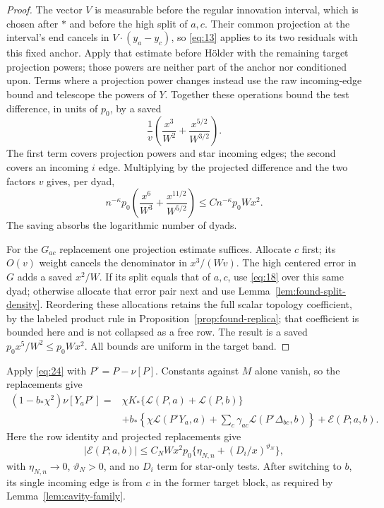 \begin{proof}
The vector \(V\) is measurable before the regular
innovation interval, which is chosen after \(*\)
and before the high split of \(a,c\).
Their common projection at the interval's end
cancels in \(V\cdot(y_a-y_c)\), so \eqref{eq:13}
applies to its two residuals with this fixed anchor.
Apply that estimate before H\"older with the remaining
target projection powers; those powers are neither
part of the anchor nor conditioned upon.
Terms where a projection power changes instead
use the raw incoming-edge bound and telescope
the powers of \(Y\). Together these operations
bound the test difference, in units of \(p_0\),
by a saved
\[
 \frac1v\left(\frac{x^3}{W^2}
                          +\frac{x^{5/2}}{W^{3/2}}\right).
\]
The first term covers projection powers and star incoming
edges; the second covers an incoming \(i\) edge.
Multiplying by the projected difference and the two
factors \(v\) gives, per dyad,
\[
 n^{-\kappa}p_0
  \left(\frac{x^6}{W^3}+\frac{x^{11/2}}{W^{5/2}}\right)
                           \le Cn^{-\kappa}p_0Wx^2.
\]
The saving absorbs the logarithmic number of dyads.

For the \(G_{ac}\) replacement one projection estimate
suffices. Allocate \(c\) first; its \(O(v)\) weight
cancels the denominator in \(x^3/(Wv)\).
The high centered error in \(G\) adds a saved \(x^2/W\).
If its split equals that of \(a,c\), use \eqref{eq:18}
over this same dyad; otherwise allocate that error pair
next and use Lemma~\ref{lem:found-split-density}. Reordering these
allocations retains the full scalar topology coefficient, by the
labeled product rule in Proposition~\ref{prop:found-replica}; that
coefficient is bounded here and is not collapsed as a free row.
The result is
a saved \(p_0x^5/W^2\le p_0Wx^2\).
All bounds are uniform in the target band.
\end{proof}

Apply \eqref{eq:24} with \(P^\circ=P-\nu[P]\).
Constants against \(M\) alone vanish, so the replacements give
\begin{equation}\label{eq:25}\tag{25}
 \begin{split}
 (1-b_*\chi^2)\nu[Y_aP^\circ]
   ={}&\chi K_*\{\mathcal L(P,a)+\mathcal L(P,b)\}\\
     &+b_*\left\{\chi\mathcal L(P^\circ Y_a,a)
       +\sum_c\gamma_{ac}\mathcal L(P^\circ\Delta_{bc},b)\right\}
       +\mathcal E(P;a,b).
 \end{split}
\end{equation}
Here the row identity and projected replacements give
\[
 |\mathcal E(P;a,b)|\le
 C_NWx^2p_0\{\eta_{N,n}+(D_i/x)^{\vartheta_N}\},
\]
with \(\eta_{N,n}\to0\), \(\vartheta_N>0\), and no \(D_i\)
term for star-only tests.
After switching to \(b\), its single incoming edge is from
\(c\) in the former target block, as required by
Lemma~\ref{lem:cavity-family}.

